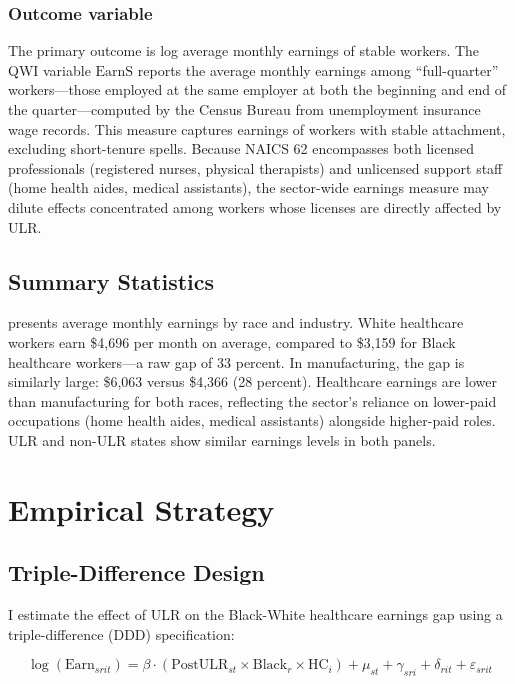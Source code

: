 \documentclass[12pt]{article}
\begin{document}
\subsubsection*{Outcome variable} The primary outcome is log average monthly earnings of stable workers. The QWI variable $\text{EarnS}$ reports the average monthly earnings among ``full-quarter'' workers---those employed at the same employer at both the beginning and end of the quarter---computed by the Census Bureau from unemployment insurance wage records. This measure captures earnings of workers with stable attachment, excluding short-tenure spells. Because NAICS 62 encompasses both licensed professionals (registered nurses, physical therapists) and unlicensed support staff (home health aides, medical assistants), the sector-wide earnings measure may dilute effects concentrated among workers whose licenses are directly affected by ULR.

\subsection{Summary Statistics}



 presents average monthly earnings by race and industry. White healthcare workers earn \$4,696 per month on average, compared to \$3,159 for Black healthcare workers---a raw gap of 33 percent. In manufacturing, the gap is similarly large: \$6,063 versus \$4,366 (28 percent). Healthcare earnings are lower than manufacturing for both races, reflecting the sector's reliance on lower-paid occupations (home health aides, medical assistants) alongside higher-paid roles. ULR and non-ULR states show similar earnings levels in both panels.

\section{Empirical Strategy}

\subsection{Triple-Difference Design}

I estimate the effect of ULR on the Black-White healthcare earnings gap using a triple-difference (DDD) specification:

\begin{equation}
\log(\text{Earn}_{srit}) = \beta \cdot (\text{PostULR}_{st} \times \text{Black}_r \times \text{HC}_i) + \mu_{st} + \gamma_{sri} + \delta_{rit} + \varepsilon_{srit}
\label{eq:ddd}
\end{equation}
\end{document}
